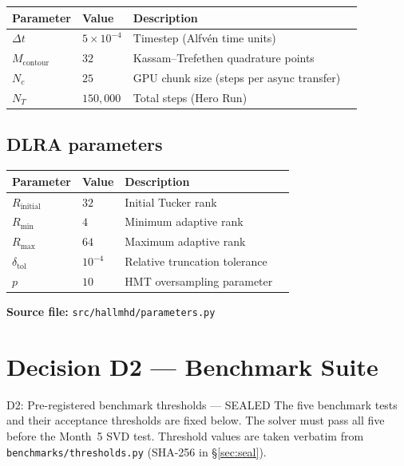 \documentclass[11pt, a4paper]{article}
\begin{document}
\begin{center}
\begin{tabular}{llll}
\toprule
Parameter & Value & Description \\
\midrule
$\Delta t$ & $5\times10^{-4}$ & Timestep (Alfvén time units) \\
$M_\text{contour}$ & $32$ & Kassam--Trefethen quadrature points \\
$N_c$ & $25$ & GPU chunk size (steps per async transfer) \\
$N_T$ & $150{,}000$ & Total steps (Hero Run) \\
\bottomrule
\end{tabular}
\end{center}

\subsection{DLRA parameters}

\begin{center}
\begin{tabular}{llll}
\toprule
Parameter & Value & Description \\
\midrule
$R_\text{initial}$ & $32$ & Initial Tucker rank \\
$R_\text{min}$ & $4$ & Minimum adaptive rank \\
$R_\text{max}$ & $64$ & Maximum adaptive rank \\
$\delta_\text{tol}$ & $10^{-4}$ & Relative truncation tolerance \\
$p$ & $10$ & HMT oversampling parameter \\
\bottomrule
\end{tabular}
\end{center}

\noindent\textbf{Source file:} \texttt{src/hallmhd/parameters.py}

\section{Decision D2 --- Benchmark Suite}
\label{sec:d2}

\begin{sealbox}{D2: Pre-registered benchmark thresholds --- SEALED}
The five benchmark tests and their acceptance thresholds are fixed below.
The solver must pass all five before the Month~5 SVD test.
Threshold values are taken verbatim from
\texttt{benchmarks/thresholds.py} (SHA-256 in \S\ref{sec:seal}).
\end{sealbox}
\end{document}
